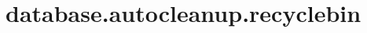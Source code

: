 \section{database.autocleanup.recyclebin}
\label{configuration:DatabaseAutocleanupRecyclebin}
\TODO
